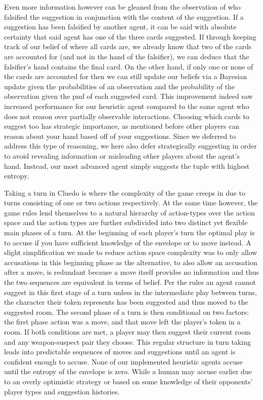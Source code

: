 \documentclass[a4paper,12pt]{proposal}
\begin{document}
Even more information however can be gleaned from the observation of who falsified the suggestion in conjunction with the content of the suggestion. If a suggestion has been falsified by another agent, it can be said with absolute certainty that said agent has one of the three cards suggested. If through keeping track of our belief of where all cards are, we already know that two of the cards are accounted for (and not in the hand of the falsifier), we can deduce that the falsifier’s hand contains the final card. On the other hand, if only one or none of the cards are accounted for then we can still update our beliefs via a Bayesian update given the probabilities of an observation and the probability of the observation given the pmf of each suggested card. This improvement indeed saw increased performance for our heuristic agent compared to the same agent who does not reason over partially observable interactions. Choosing which cards to suggest too has strategic importance, as mentioned before other players can reason about your hand based off of your suggestions. Since we deferred to address this type of reasoning, we here also defer strategically suggesting in order to avoid revealing information or misleading other players about the agent’s hand. Instead, our most advanced agent simply suggests the tuple with highest entropy. 

Taking a turn in Cluedo is where the complexity of the game creeps in due to turns consisting of one or two actions respectively. At the same time however, the game rules lend themselves to a natural hierarchy of action-types over the action space and the action types are further subdivided into two distinct yet flexible main phases of a turn. At the beginning of each player’s turn the optimal play is to accuse if you have sufficient knowledge of the envelope or to move instead. A slight simplification we made to reduce action space complexity was to only allow accusations in this beginning phase as the alternative, to also allow an accusation after a move, is redundant because a move itself provides no information and thus the two sequences are equivalent in terms of belief. Per the rules an agent cannot suggest in this first stage of a turn unless in the intermediate play between turns, the character their token represents has been suggested and thus moved to the suggested room. The second phase of a turn is then conditional on two factors: the first phase action was a move, and that move left the player’s token in a room. If both conditions are met, a player may then suggest their current room and any weapon-suspect pair they choose. This regular structure in turn taking leads into predictable sequences of moves and suggestions until an agent is confident enough to accuse. None of our implemented heuristic agents accuse until the entropy of the envelope is zero. While a human may accuse earlier due to an overly optimistic strategy or based on some knowledge of their opponents’ player types and suggestion histories. 
\end{document}
